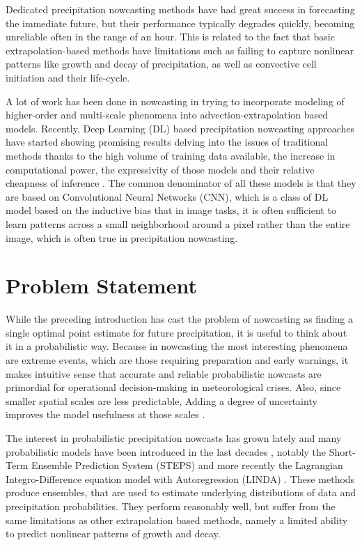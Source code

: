 Dedicated precipitation nowcasting methods have had great success in forecasting the immediate future, but their performance typically degrades quickly, becoming unreliable often in the range of an hour. This is related to the fact that basic extrapolation-based methods have limitations such as failing to capture nonlinear patterns like growth and decay of precipitation, as well as convective cell initiation and their life-cycle. 

A lot of work has been done in nowcasting in trying to incorporate modeling of higher-order and multi-scale phenomena into advection-extrapolation based models. Recently, Deep Learning (DL) based precipitation nowcasting approaches have started showing promising results delving into the issues of traditional methods thanks to the high volume of training data available, the increase in computational power, the expressivity of those models and their relative cheapness of inference \cite{shi_convolutional_2015,shi_deep_2017,ayzel_rainnet_nodate}. The common denominator of all these models is that they are based on Convolutional Neural Networks (CNN), which is a class of DL model based on the inductive bias that in image tasks, it is often sufficient to learn patterns across a small neighborhood around a pixel rather than the entire image, which is often true in precipitation nowcasting.


\section{Problem Statement}


While the preceding introduction has cast the problem of nowcasting as finding a single optimal point estimate for future precipitation, it is useful to think about it in a probabilistic way. Because in nowcasting the most interesting phenomena are extreme events, which are those requiring preparation and early warnings, it makes intuitive sense that accurate and reliable probabilistic nowcasts are primordial for operational decision-making in meteorological crises. Also, since smaller spatial scales are less predictable, Adding a degree of uncertainty improves the model usefulness at those scales \cite{germann2002scale}.

The interest in probabilistic precipitation nowcasts has grown lately and many probabilistic models have been introduced in the last decades \cite{seed_formulation_2013, andersson_model_1991, schmid2002short, fox2005bayesian}, notably the Short-Term Ensemble Prediction System (STEPS) \cite{bowler_steps_2006} and more recently the Lagrangian Integro-Difference equation model with Autoregression (LINDA) \cite{pulkkinen_lagrangian_2021}. These methods produce ensembles, that are used to estimate underlying distributions of data and precipitation probabilities. They perform reasonably well, but  suffer from the same limitations as other extrapolation based methods, namely a limited ability to predict nonlinear patterns of growth and decay. 

